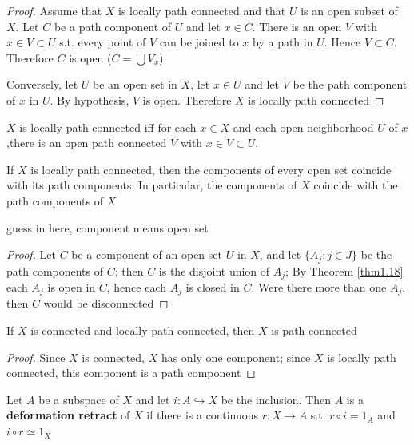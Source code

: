 \documentclass[11pt]{article}
\begin{document}
\begin{proof}
Assume that \(X\) is locally path connected and that \(U\) is an open subset of \(X\). Let \(C\)
be a path component of \(U\) and let \(x\in C\). There is an open \(V\) with \(x\in V\subset U\) s.t. every
point of \(V\) can be joined to \(x\) by a path in \(U\). Hence \(V\subset C\). Therefore \(C\) is
open (\(C=\bigcup V_x\)).

Conversely, let \(U\) be an open set in \(X\), let \(x\in U\) and let \(V\) be the path component
of \(x\) in \(U\). By hypothesis, \(V\) is open. Therefore \(X\) is locally path connected
\end{proof}

\begin{corollary}[]
\(X\) is locally path connected iff for each \(x\in X\) and each open neighborhood \(U\) of \(x\)
,there is an open path connected \(V\) with \(x\in V\subset U\).
\end{corollary}

\begin{corollary}[]
If \(X\) is locally path connected, then the components of every open set coincide with its path
components. In particular, the components of \(X\) coincide with the path components of \(X\)
\end{corollary}

guess in here, component means open set

\begin{proof}
Let \(C\) be a component of an open set \(U\) in \(X\), and let \(\{A_j:j\in J\}\) be the path
components of \(C\); then \(C\) is the disjoint union of \(A_j\); By Theorem \ref{thm1.18}
each \(A_j\) is open in \(C\), hence each \(A_j\) is closed in \(C\). Were there more than
one \(A_j\), then \(C\) would be disconnected
\end{proof}

\begin{corollary}[]
If \(X\) is connected and locally path connected, then \(X\) is path connected
\end{corollary}

\begin{proof}
Since \(X\) is connected, \(X\) has only one component; since \(X\) is locally path connected,
this component is a path component
\end{proof}

\begin{definition}[]
Let \(A\) be a subspace of \(X\) and let \(i:A\hookrightarrow X\) be the inclusion. Then \(A\) is a
\textbf{deformation retract} of \(X\) if there is a continuous \(r:X\to A\) s.t. \(r\circ i=1_A\)
and \(i\circ r\simeq 1_X\)
\end{definition}
\end{document}

